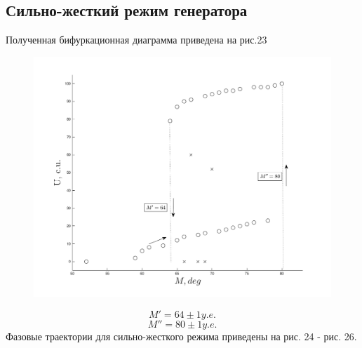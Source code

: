 \subsection{Сильно-жесткий режим генератора}
Полученная бифуркационная диаграмма приведена на рис.23
\begin{center}
    \begin{figure}[H]
        \vspace{-10pt}
            \includegraphics[width=\linewidth]{graph/g3} 
            \vspace{-10pt}
            \label{fig:10}
            \vspace{-40pt}
    \end{figure}
\end{center} 
$$M'= 64 \pm 1 y.e.$$ $$M''= 80 \pm 1 y.e.$$ 
Фазовые траектории для сильно-жесткого режима приведены на рис. 24 - рис. 26.
